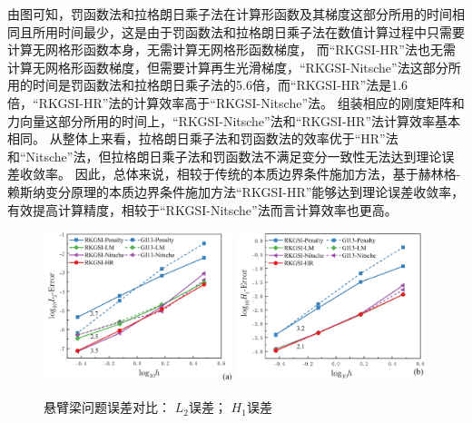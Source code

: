 由图可知，罚函数法和拉格朗日乘子法在计算形函数及其梯度这部分所用的时间相同且所用时间最少，这是由于罚函数法和拉格朗日乘子法在数值计算过程中只需要计算无网格形函数本身，无需计算无网格形函数梯度，
而“RKGSI-HR”法也无需计算无网格形函数梯度，但需要计算再生光滑梯度，“RKGSI-Nitsche”法这部分所用的时间是罚函数法和拉格朗日乘子法的5.6倍，而“RKGSI-HR”法是1.6倍，“RKGSI-HR”法的计算效率高于“RKGSI-Nitsche”法。
组装相应的刚度矩阵和力向量这部分所用的时间上，“RKGSI-Nitsche”法和“RKGSI-HR”法计算效率基本相同。
从整体上来看，拉格朗日乘子法和罚函数法的效率优于“HR”法和“Nitsche”法，但拉格朗日乘子法和罚函数法不满足变分一致性无法达到理论误差收敛率。
因此，总体来说，相较于传统的本质边界条件施加方法，基于赫林格-赖斯纳变分原理的本质边界条件施加方法“RKGSI-HR”能够达到理论误差收敛率，有效提高计算精度，相较于“RKGSI-Nitsche”法而言计算效率也更高。
\begin{figure}[H]
\centering
\begin{subcaptiongroup}
    \includegraphics[width=0.49\textwidth]{figure/EHR/cantilever/L2.png}
    \label{ECL2}
    \includegraphics[width=0.49\textwidth]{figure/EHR/cantilever/H1.png}
    \label{ECH1}
    \end{subcaptiongroup}
\caption{悬臂梁问题误差对比： $L_2$误差； $H_1$误差}
\label{ECLH}
\end{figure}
